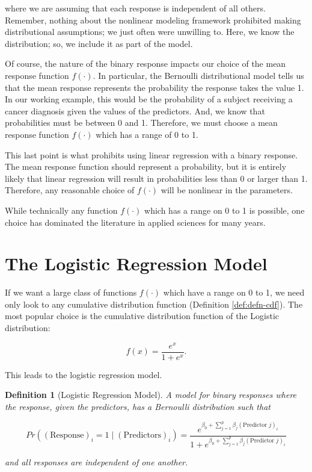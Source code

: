 \documentclass[
]{book}
\theoremstyle{plain}
\theoremstyle{mydefn}
\newtheorem{definition}{Definition}[chapter]
\theoremstyle{myexmpl}
\theoremstyle{remark}
\begin{document}
where we are assuming that each response is independent of all others. Remember, nothing about the nonlinear modeling framework prohibited making distributional assumptions; we just often were unwilling to. Here, we know the distribution; so, we include it as part of the model.

Of course, the nature of the binary response impacts our choice of the mean response function \(f(\cdot)\). In particular, the Bernoulli distributional model tells us that the mean response represents the probability the response takes the value 1. In our working example, this would be the probability of a subject receiving a cancer diagnosis given the values of the predictors. And, we know that probabilities must be between 0 and 1. Therefore, we must choose a mean response function \(f(\cdot)\) which has a range of 0 to 1.

This last point is what prohibits using linear regression with a binary response. The mean response function should represent a probability, but it is entirely likely that linear regression will result in probabilities less than 0 or larger than 1. Therefore, any reasonable choice of \(f(\cdot)\) will be nonlinear in the parameters.

While technically any function \(f(\cdot)\) which has a range on 0 to 1 is possible, one choice has dominated the literature in applied sciences for many years.

\hypertarget{the-logistic-regression-model}{%
\section{The Logistic Regression Model}\label{the-logistic-regression-model}}

If we want a large class of functions \(f(\cdot)\) which have a range on 0 to 1, we need only look to any cumulative distribution function (Definition \ref{def:defn-cdf}). The most popular choice is the cumulative distribution function of the Logistic distribution:

\[f(x) = \frac{e^x}{1 + e^x}.\]

This leads to the logistic regression model.

\begin{definition}[Logistic Regression Model]
A model for binary responses where the response, given the predictors, has a Bernoulli distribution such that

\[Pr\left((\text{Response})_i = 1 \mid (\text{Predictors})_i\right) = 
    \frac{e^{\beta_0 + \sum_{j=1}^{p} \beta_j (\text{Predictor } j)_i}}{1 + e^{\beta_0 + \sum_{j=1}^{p} \beta_j (\text{Predictor } j)_i}}\]

and all responses are independent of one another.
\end{definition}
\end{document}
